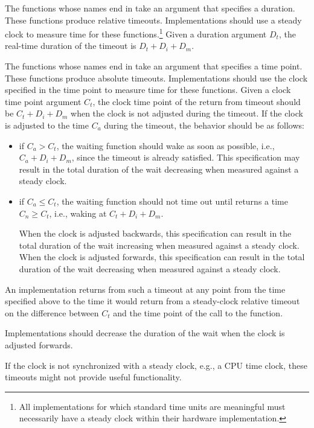 \pnum
The functions whose names end in  take an argument that
specifies a duration. These functions produce relative timeouts. Implementations
should use a steady clock to measure time for these functions.\footnote{All
implementations for which standard time units are meaningful must necessarily
have a steady clock within their hardware implementation.} Given a duration
argument $D_t$, the real-time duration of the timeout is $D_t + D_i + D_m$.

\pnum
The functions whose names end in  take an argument that specifies a time
point. These functions produce absolute timeouts. Implementations should use the clock
specified in the time point to measure time for these functions. Given a clock time point
argument $C_t$, the clock time point of the return from timeout should be $C_t + D_i + D_m$
when the clock is not adjusted during the timeout. If the clock is adjusted to the time $C_a$
during the timeout, the behavior should be as follows:
\begin{itemize}
\item
if $C_a > C_t$, the waiting function should wake as soon as possible, i.e., $C_a + D_i + D_m$,
since the timeout is already satisfied.
This specification may result in the total
duration of the wait decreasing when measured against a steady clock.

\item
if $C_a \leq C_t$, the waiting function should not time out until  returns a
time $C_n \geq C_t$, i.e., waking at $C_t + D_i + D_m$.
\begin{note}
When the clock is adjusted
backwards, this specification can result in the total duration of the wait increasing when
measured against a steady clock. When the clock is adjusted forwards, this specification can
result in the total duration of the wait decreasing when measured against a steady clock.
\end{note}
\end{itemize}

An implementation returns from such a timeout at any point from the time specified above to
the time it would return from a steady-clock relative timeout on the difference between $C_t$
and the time point of the call to the  function.
\begin{note}
Implementations
should decrease the duration of the wait when the clock is adjusted forwards.
\end{note}

\pnum
\begin{note}
If the clock is not synchronized with a steady clock, e.g., a CPU time clock, these
timeouts might not provide useful functionality.
\end{note}


